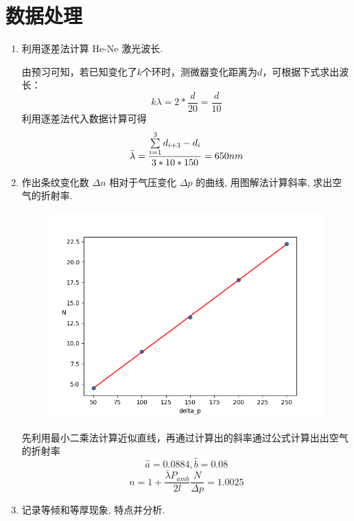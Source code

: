 \documentclass[signature=data]{physicsreport}
\begin{document}
\section{数据处理}
\begin{enumerate}
    \item 利用逐差法计算 He-Ne 激光波长.
    
    由预习可知，若已知变化了$k$个环时，测微器变化距离为$d$，可根据下式求出波长：
    $$
    k\lambda=2*\frac{d}{20}=\frac{d}{10}
    $$
    利用逐差法代入数据计算可得
    $$
    \Bar{\lambda}=\frac{\sum\limits_{i=1}^3{d_{i+3}-d_{i}}}{3*10*150}=650nm
    $$
    \item 作出条纹变化数 $\Delta n$ 相对于气压变化 $\Delta p$ 的曲线, 用图解法计算斜率, 求出空气的折射率.
    \begin{figure}[htbp]
    \centering
    \includegraphics[width=0.7\linewidth]{images/lab1/p-N.png}
    \end{figure} 
    
    先利用最小二乘法计算近似直线，再通过计算出的斜率通过公式计算出出空气的折射率
    $$\hat{a}=0.0884,\hat{b}=0.08$$
    $$n=1+\frac{\bar{\lambda} P_{a m b}}{2 l} \frac{N}{\Delta p}=1.0025$$
    \item 记录等倾和等厚现象, 特点并分析.


\end{enumerate}
\end{document}
